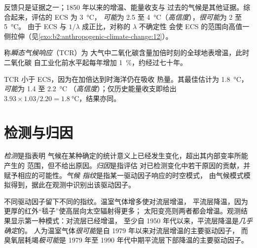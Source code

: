 反馈只是证据之一；1850 年以来的增温、能量收支与
过去的气候是其他证据。综合起来，评估的 ECS 为 \qty{3}{\celsius}，
\emph{可能}为 2.5 至 \qty{4}{\celsius}（\emph{高信度}），\emph{很可能}为 2 至 \qty{5}{\celsius}。
由于 ECS 与 $1/\lambda$ 成正比，对称的 $\lambda$ 不确定性
会使 ECS 的范围向高值一侧拉伸（见\cref{exo:b2:anthropogenic-climate-change:12}）。

\begin{definition}[瞬态气候响应]\label{def:b2:anthropogenic-climate-change:tcr}
称\emph{瞬态气候响应}（TCR）为
大气中二氧化碳含量加倍时刻的全球地表增温，此时二氧化碳
自工业化前水平起每年增加 \qty{1}{\percent}，约经过七十年。
\end{definition}

TCR 小于 ECS，因为在加倍达到时海洋仍在吸收
热量。其最佳估计为 \qty{1.8}{\celsius}，\emph{可能}为 1.4 至 \qty{2.2}{\celsius}
（\emph{高信度}）；仅历史能量收支即给出 $3.93 \times 1.03/2.20 =
\qty{1.8}{\celsius}$，结果亦同。

\section{检测与归因}\label{sec:b2:anthropogenic-climate-change:attribution}

\begin{definition}[检测；归因；气候指纹]\label{def:b2:anthropogenic-climate-change:da}
\emph{检测}是指表明
气候在某种确定的统计意义上已经发生变化，超出其内部变率所能产生的
范围，但不给出原因。\emph{归因}是指评估
对已检测变化中若干原因的贡献，并赋予相应的可能性。\emph{气候
指纹}是指某一驱动因子响应的时空模式，
由气候模式模拟得到，据此在观测中识别出该驱动因子。
\end{definition}

不同驱动因子留下不同的指纹。温室气体增多使对流层增温，
平流层降温，因为更厚的红外“毯子”使高层向太空辐射得更多；
太阳变亮则两者都会增温。观测结果显示第一种模式：对流层已经增温，
至少自 1950 年代以来，平流层降温是\emph{几乎确定}的。
人为温室气体\emph{很可能}是自 1979 年以来对流层增温的主要驱动因子，
而臭氧层耗竭\emph{极可能}是
1979 年至 1990 年代中期平流层下部降温的主要驱动因子。

